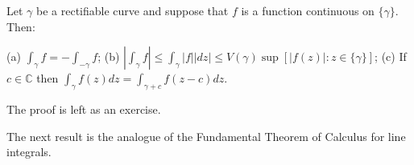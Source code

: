 Let $\gamma$ be a rectifiable curve and suppose that $f$ is a function continuous on $\{\gamma\}$. Then:

(a) $\int_{\gamma} f = -\int_{-\gamma} f$;
(b) $\left| \int_{\gamma} f \right| \leq \int_{\gamma} |f| |dz| \leq V(\gamma) \sup \left[ |f(z)| : z \in \{\gamma\} \right]$;
(c) If $c \in \mathbb{C}$ then $\int_{\gamma} f(z) dz = \int_{\gamma + c} f(z - c) dz$.

The proof is left as an exercise.

The next result is the analogue of the Fundamental Theorem of Calculus for line integrals.